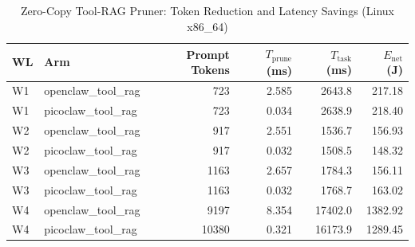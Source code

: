 \begin{table}[t]
\centering\small
\caption{Zero-Copy Tool-RAG Pruner: Token Reduction and Latency Savings (Linux x86_64)}
\label{tab:linux_tool_rag}
\begin{tabular}{llrrrr}
\toprule
WL & Arm & Prompt Tokens & $T_{\text{prune}}$ (ms) & $T_{\text{task}}$ (ms) & $E_{\text{net}}$ (J) \\
\midrule
W1 & openclaw\_tool\_rag & 723 & 2.585 & 2643.8 & 217.18 \\
W1 & picoclaw\_tool\_rag & 723 & 0.034 & 2638.9 & 218.40 \\
W2 & openclaw\_tool\_rag & 917 & 2.551 & 1536.7 & 156.93 \\
W2 & picoclaw\_tool\_rag & 917 & 0.032 & 1508.5 & 148.32 \\
W3 & openclaw\_tool\_rag & 1163 & 2.657 & 1784.3 & 156.11 \\
W3 & picoclaw\_tool\_rag & 1163 & 0.032 & 1768.7 & 163.02 \\
W4 & openclaw\_tool\_rag & 9197 & 8.354 & 17402.0 & 1382.92 \\
W4 & picoclaw\_tool\_rag & 10380 & 0.321 & 16173.9 & 1289.45 \\
\bottomrule
\end{tabular}
\end{table}
